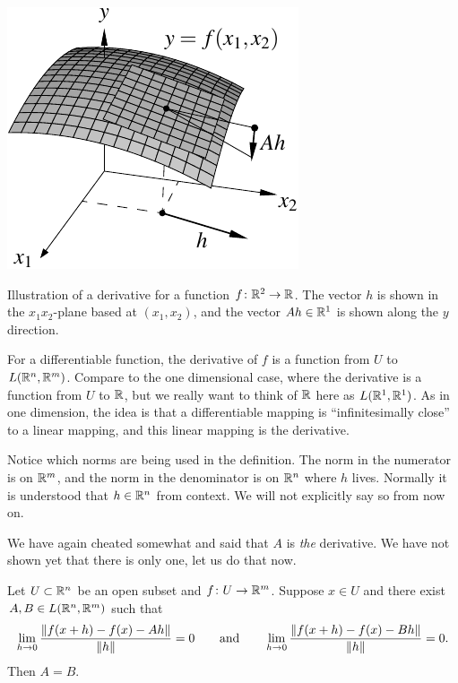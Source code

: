 \begin{myfigureht}
\includegraphics{figures/svder}
\caption{Illustration of a derivative for a function $f \colon {\mathbb{R}}^2 \to {\mathbb{R}}$.  The vector $h$ is shown
in the $x_1x_2$-plane based at $(x_1,x_2)$, and the vector
$Ah \in {\mathbb{R}}^1$ is shown along the $y$ direction.\label{fig:svder}}
\end{myfigureht}

For a differentiable function,
the derivative of $f$ is a function from $U$ to $L({\mathbb{R}}^n,{\mathbb{R}}^m)$.  Compare
to the one dimensional case, where the derivative is a function
from $U$ to ${\mathbb{R}}$, but we really want to think of ${\mathbb{R}}$ here as
$L({\mathbb{R}}^1,{\mathbb{R}}^1)$.  As in one dimension, the idea is that a differentiable
mapping is ``infinitesimally close'' to a linear mapping, and this
linear mapping is the derivative.

Notice which norms are being used in the definition.
The norm in the
numerator is on ${\mathbb{R}}^m$, and the norm in the denominator is on ${\mathbb{R}}^n$ where $h$
lives.
Normally it is 
understood that $h \in {\mathbb{R}}^n$ from context.
We will not explicitly say so from now on.

We have again cheated somewhat and said that $A$
is \emph{the} derivative.  We have not shown yet that there
is only one, let us do that now.

\begin{prop}
Let $U \subset {\mathbb{R}}^n$ be an open subset and $f \colon U \to {\mathbb{R}}^m$.  Suppose
$x \in U$ and there exist 
$A,B \in L({\mathbb{R}}^n,{\mathbb{R}}^m)$ such that
\begin{equation*}
\lim_{h \to 0}
\frac{\lVert {f(x+h)-f(x) - Ah} \rVert}{\lVert {h} \rVert} = 0
\qquad \text{and} \qquad
\lim_{h \to 0}
\frac{\lVert {f(x+h)-f(x) - Bh} \rVert}{\lVert {h} \rVert} = 0 .
\end{equation*}
Then $A=B$.
\end{prop}

